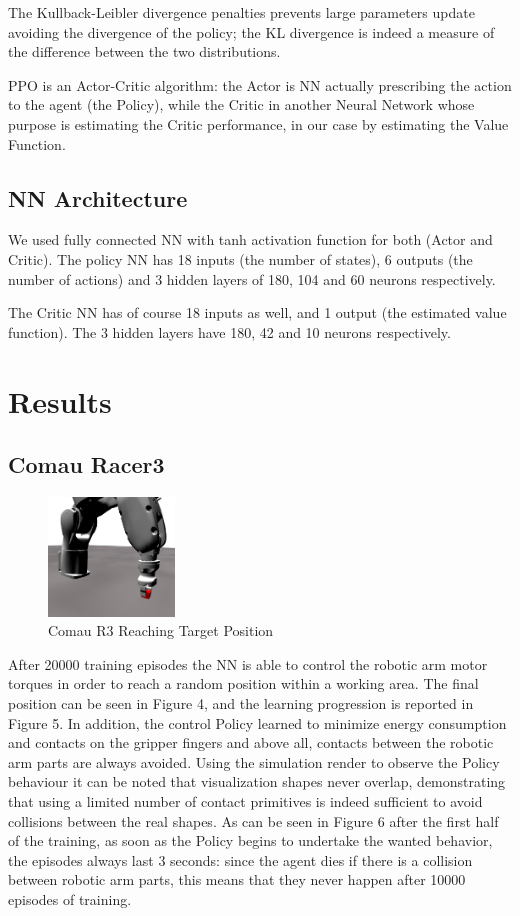 \documentclass{sig-alternate-05-2015}
\begin{document}
The Kullback-Leibler divergence penalties prevents large parameters update avoiding the divergence of the policy; the KL divergence is indeed a measure of the difference between the two distributions.

PPO is an Actor-Critic algorithm: the Actor is NN actually prescribing the action  to the agent (the Policy), while the Critic in another Neural Network whose purpose is estimating the Critic performance, in our case by estimating the Value Function.


\subsection{NN Architecture}
We used fully connected NN with tanh activation function for both (Actor and Critic).
The policy NN has 18 inputs (the number of states), 6 outputs (the number of actions) and 3 hidden layers of 180, 104 and 60 neurons respectively.

The Critic NN has of course 18 inputs as well, and 1 output (the estimated value function). The 3 hidden layers have 180, 42 and 10 neurons respectively.
\section{Results}
\subsection{Comau Racer3}

\begin{figure}[ht] \label{Objective}
\centering
\includegraphics[width=0.3\textwidth]{Figures/objective.jpg}
\caption{Comau R3 Reaching Target Position }
\end{figure}

After 20000 training episodes the NN is able to control the robotic arm motor torques in order to reach a random position within a working area. The final position can be seen in Figure  4, and the learning progression is reported in Figure 5.
In addition, the control Policy learned to minimize energy consumption and contacts on the gripper fingers and above all, contacts between the robotic arm parts are always avoided. 
Using the simulation render to observe the Policy behaviour it can be noted that visualization shapes never overlap, demonstrating that using a limited number of contact primitives is indeed sufficient to avoid collisions between the real shapes. As can be seen in Figure 6 after the first half of the training, as soon as the Policy begins to undertake the wanted behavior, the episodes always last 3 seconds: since the agent dies if there is a collision between robotic arm parts, this means that they never happen after 10000 episodes of training.
\end{document}
